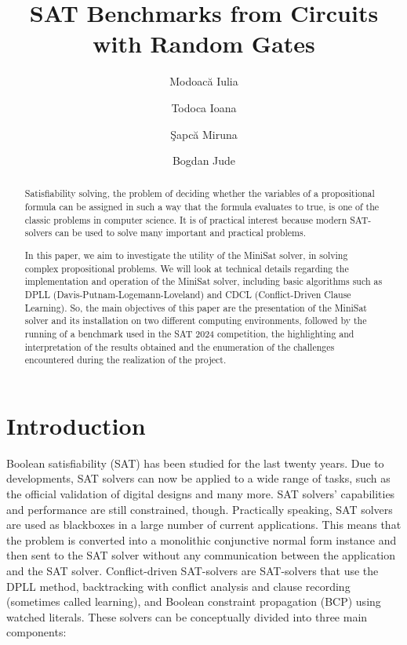 \documentclass[runningheads]{llncs}
\begin{document}
%
\title{SAT Benchmarks from Circuits with Random Gates}
%
%
\author{Modoac\u a Iulia \and
Todoca Ioana \and
\c Sapc\u a Miruna \and
 Bogdan Jude}
%
%
%
\maketitle              %
%
\begin{abstract}
Satisfiability solving, the problem of deciding
whether the variables of a propositional formula can be assigned in such a way that the formula evaluates to true, is one of the classic problems in computer science.  It is
of practical interest because modern SAT-solvers can be used to
solve many important and practical problems.

In this paper, we aim to investigate the utility of the MiniSat solver, in solving complex propositional problems. We will look at technical details regarding the implementation and operation of the MiniSat solver, including basic algorithms such as DPLL (Davis-Putnam-Logemann-Loveland) and CDCL (Conflict-Driven Clause Learning). So, the main objectives of this paper are the presentation of the MiniSat solver and its installation on two different computing environments, followed by the running of a benchmark used in the SAT 2024 competition, the highlighting and interpretation of the results obtained and the enumeration of the challenges encountered during the realization of the project.

\end{abstract}
%
%
%
\section{Introduction}

Boolean satisfiability (SAT) has been studied for the last twenty years. Due to developments, SAT solvers can now be applied to a wide range of tasks, such as the official validation of digital designs and many more. SAT solvers' capabilities and performance are still constrained, though. Practically speaking, SAT solvers are used as blackboxes in a large number of current applications. This means that the problem is converted into a monolithic conjunctive normal form instance and then sent to the SAT solver without any communication between the application and the SAT solver. Conflict-driven SAT-solvers are SAT-solvers that use the DPLL method, backtracking with conflict analysis and clause recording (sometimes called learning), and Boolean constraint propagation (BCP) using watched literals. These solvers can be conceptually divided into three main components:
\end{document}
